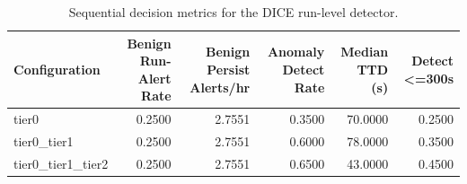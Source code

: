\begin{table}[t]
\centering
\caption{Sequential decision metrics for the DICE run-level detector.}
\label{tab:dice_sequential_metrics}
\footnotesize
\begin{tabular}{lrrrrr}
\toprule
Configuration & Benign Run-Alert Rate & Benign Persist Alerts/hr & Anomaly Detect Rate & Median TTD (s) & Detect <=300s \\
\midrule
tier0 & 0.2500 & 2.7551 & 0.3500 & 70.0000 & 0.2500 \\
tier0_tier1 & 0.2500 & 2.7551 & 0.6000 & 78.0000 & 0.3500 \\
tier0_tier1_tier2 & 0.2500 & 2.7551 & 0.6500 & 43.0000 & 0.4500 \\
\bottomrule
\end{tabular}

\end{table}
